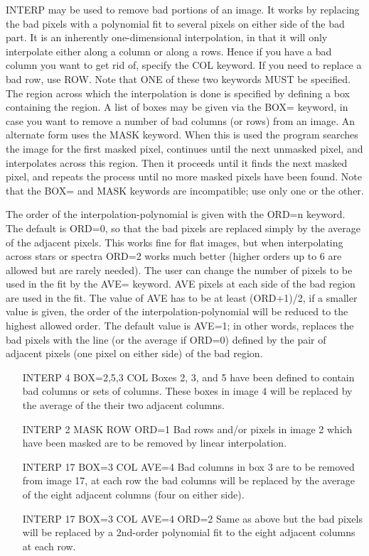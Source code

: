 INTERP may be used to remove bad portions of an image.  It works by
replacing the bad pixels with a polynomial fit to several pixels on either
side of the bad part.  It is an inherently one-dimensional interpolation,
in that it will only interpolate either along a column or along a rows.
Hence if you have a bad column you want to get rid of, specify the COL
keyword.  If you need to replace a bad row, use ROW.  Note that ONE of
these two keywords MUST be specified. The region across which the
interpolation is done is specified by defining a box containing the
region. A list of boxes may be given via the BOX= keyword, in case you want
to remove a number of bad columns (or rows) from an image.  An alternate
form uses the MASK keyword.  When this is used the program searches the
image for the first masked pixel, continues until the next unmasked pixel,
and interpolates across this region.  Then it proceeds until it finds the
next masked pixel, and repeats the process until no more masked pixels have
been found.  Note that the BOX= and MASK keywords are incompatible; use
only one or the other.

The order of the interpolation-polynomial is given with the ORD=n
keyword. The default is ORD=0, so that the bad pixels are replaced simply
by the average of the adjacent pixels. This works fine for flat images, but
when interpolating across stars or spectra ORD=2 works much better (higher
orders up to 6 are allowed but are rarely needed).  The user can change the
number of pixels to be used in the fit by the AVE= keyword.  AVE pixels at
each side of the bad region are used in the fit.  The value of AVE has to
be at least (ORD+1)/2, if a smaller value is given, the order of the
interpolation-polynomial will be reduced to the highest allowed order. The
default value is AVE=1; in other words, replaces the bad pixels with the
line (or the average if ORD=0) defined by the pair of adjacent pixels (one
pixel on either side) of the bad region.

\begin{itemize}
  \item[INTERP 4 BOX=2,5,3 COL\hfill]{Boxes 2, 3, and 5 have been defined
       to contain bad columns or sets of columns.  These boxes in image 4
       will be replaced by the average of the their two adjacent columns.}

  \item[INTERP 2 MASK ROW ORD=1\hfill]{Bad rows and/or pixels in image 2
       which have been masked are to be removed by linear interpolation.}

  \item[INTERP 17 BOX=3 COL AVE=4\hfill]{Bad columns in box 3 are to be
       removed from image 17, at each row the bad columns will be replaced
       by the average of the eight adjacent columns (four on either side).}

  \item[INTERP 17 BOX=3 COL AVE=4 ORD=2\hfill]{Same as above but the bad
       pixels will be replaced by a 2nd-order polynomial fit to the eight
       adjacent columns at each row.}
\end{itemize}

